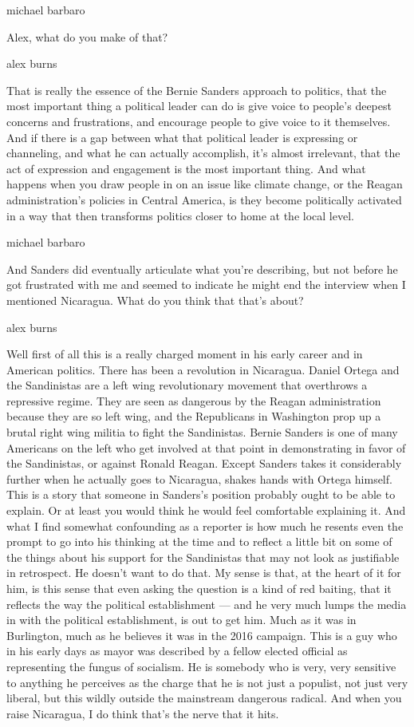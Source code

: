 michael barbaro

Alex, what do you make of that?

alex burns

That is really the essence of the Bernie Sanders approach to politics,
that the most important thing a political leader can do is give voice to
people's deepest concerns and frustrations, and encourage people to give
voice to it themselves. And if there is a gap between what that
political leader is expressing or channeling, and what he can actually
accomplish, it's almost irrelevant, that the act of expression and
engagement is the most important thing. And what happens when you draw
people in on an issue like climate change, or the Reagan
administration's policies in Central America, is they become politically
activated in a way that then transforms politics closer to home at the
local level.

michael barbaro

And Sanders did eventually articulate what you're describing, but not
before he got frustrated with me and seemed to indicate he might end the
interview when I mentioned Nicaragua. What do you think that that's
about?

alex burns

Well first of all this is a really charged moment in his early career
and in American politics. There has been a revolution in Nicaragua.
Daniel Ortega and the Sandinistas are a left wing revolutionary movement
that overthrows a repressive regime. They are seen as dangerous by the
Reagan administration because they are so left wing, and the Republicans
in Washington prop up a brutal right wing militia to fight the
Sandinistas. Bernie Sanders is one of many Americans on the left who get
involved at that point in demonstrating in favor of the Sandinistas, or
against Ronald Reagan. Except Sanders takes it considerably further when
he actually goes to Nicaragua, shakes hands with Ortega himself. This is
a story that someone in Sanders's position probably ought to be able to
explain. Or at least you would think he would feel comfortable
explaining it. And what I find somewhat confounding as a reporter is how
much he resents even the prompt to go into his thinking at the time and
to reflect a little bit on some of the things about his support for the
Sandinistas that may not look as justifiable in retrospect. He doesn't
want to do that. My sense is that, at the heart of it for him, is this
sense that even asking the question is a kind of red baiting, that it
reflects the way the political establishment --- and he very much lumps
the media in with the political establishment, is out to get him. Much
as it was in Burlington, much as he believes it was in the 2016
campaign. This is a guy who in his early days as mayor was described by
a fellow elected official as representing the fungus of socialism. He is
somebody who is very, very sensitive to anything he perceives as the
charge that he is not just a populist, not just very liberal, but this
wildly outside the mainstream dangerous radical. And when you raise
Nicaragua, I do think that's the nerve that it hits.


